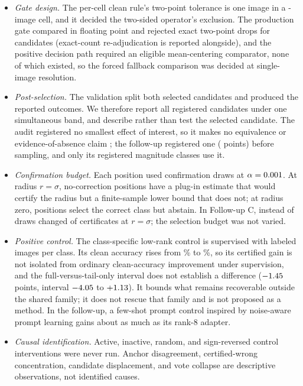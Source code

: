 \begin{itemize}
\item \textit{Gate design.} The per-cell clean rule's two-point tolerance is one image in a \ExpEurosatItemsPerCell{}-image cell, and it decided the two-sided operator's exclusion. The production gate compared in floating point and rejected exact two-point drops for \FloatGateRejectedCandidates{} candidates (exact-count re-adjudication is reported alongside), and the positive decision path required an eligible mean-centering comparator, none of which existed, so the forced fallback comparison was decided at single-image resolution.
\item \textit{Post-selection.} The validation split both selected candidates and produced the reported outcomes. We therefore report all \ExpCandidates{} registered candidates under one simultaneous band, and describe rather than test the selected candidate. The audit registered no smallest effect of interest, so it makes no equivalence or evidence-of-absence claim \cite{lakens2017equivalence}; the follow-up registered one (\FUSESOI{} points) before sampling, and only its registered magnitude classes use it.
\item \textit{Confirmation budget.} Each position used \ExpConfDraws{} confirmation draws at $\alpha=0.001$. At radius $r=\sigma$, \CensoredNoCorrRQuarter{} no-correction positions have a plug-in estimate that would certify the radius but a finite-sample lower bound that does not; at radius zero, \CensoredNoCorrRZero{} positions select the correct class but abstain. In Follow-up C, \FUBudgetDraws{} instead of \FUConfDraws{} draws changed \FUQNineAllChanged{} of \FUQNineAllCerts{} certificates at $r=\sigma$; the selection budget was not varied.
\item \textit{Positive control.} The class-specific low-rank control is supervised with \FarlaShots{} labeled images per class. Its clean accuracy rises from \FarlaIdentityClean\% to \FarlaFullClean\%, so its certified gain is not isolated from ordinary clean-accuracy improvement under supervision, and the full-versus-tail-only interval does not establish a difference ($-1.45$ points, interval $-4.05$ to $+1.13$). It bounds what remains recoverable outside the shared family; it does not rescue that family and is not proposed as a method. In the follow-up, a few-shot prompt control inspired by noise-aware prompt learning \cite{hussein2024promptsmooth} gains about as much as its rank-8 adapter.
\item \textit{Causal identification.} Active, inactive, random, and sign-reversed control interventions were never run. Anchor disagreement, certified-wrong concentration, candidate displacement, and vote collapse are descriptive observations, not identified causes.

\end{itemize}
